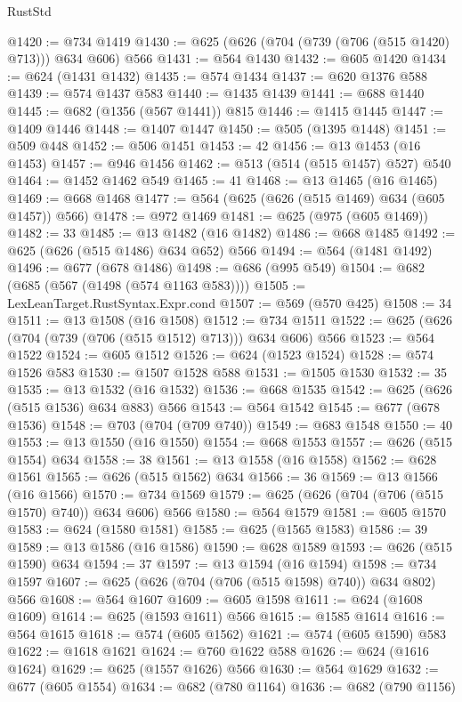 \begin{lexlean}{RustStd}
\begin{coremodule}
@1420 := @734 @1419
@1430 := @625 (@626 (@704 (@739 (@706 (@515 @1420) @713))) @634 @606) @566
@1431 := @564 @1430
@1432 := @605 @1420
@1434 := @624 (@1431 @1432)
@1435 := @574 @1434
@1437 := @620 @1376 @588
@1439 := @574 @1437 @583
@1440 := @1435 @1439
@1441 := @688 @1440
@1445 := @682 (@1356 (@567 @1441)) @815
@1446 := @1415 @1445
@1447 := @1409 @1446
@1448 := @1407 @1447
@1450 := @505 (@1395 @1448)
@1451 := @509 @448
@1452 := @506 @1451
@1453 := 42
@1456 := @13 @1453 (@16 @1453)
@1457 := @946 @1456
@1462 := @513 (@514 (@515 @1457) @527) @540
@1464 := @1452 @1462 @549
@1465 := 41
@1468 := @13 @1465 (@16 @1465)
@1469 := @668 @1468
@1477 := @564 (@625 (@626 (@515 @1469) @634 (@605 @1457)) @566)
@1478 := @972 @1469
@1481 := @625 (@975 (@605 @1469))
@1482 := 33
@1485 := @13 @1482 (@16 @1482)
@1486 := @668 @1485
@1492 := @625 (@626 (@515 @1486) @634 @652) @566
@1494 := @564 (@1481 @1492)
@1496 := @677 (@678 @1486)
@1498 := @686 (@995 @549)
@1504 := @682 (@685 (@567 (@1498 (@574 @1163 @583))))
@1505 := LexLeanTarget.RustSyntax.Expr.cond
@1507 := @569 (@570 @425)
@1508 := 34
@1511 := @13 @1508 (@16 @1508)
@1512 := @734 @1511
@1522 := @625 (@626 (@704 (@739 (@706 (@515 @1512) @713))) @634 @606) @566
@1523 := @564 @1522
@1524 := @605 @1512
@1526 := @624 (@1523 @1524)
@1528 := @574 @1526 @583
@1530 := @1507 @1528 @588
@1531 := @1505 @1530
@1532 := 35
@1535 := @13 @1532 (@16 @1532)
@1536 := @668 @1535
@1542 := @625 (@626 (@515 @1536) @634 @883) @566
@1543 := @564 @1542
@1545 := @677 (@678 @1536)
@1548 := @703 (@704 (@709 @740))
@1549 := @683 @1548
@1550 := 40
@1553 := @13 @1550 (@16 @1550)
@1554 := @668 @1553
@1557 := @626 (@515 @1554) @634
@1558 := 38
@1561 := @13 @1558 (@16 @1558)
@1562 := @628 @1561
@1565 := @626 (@515 @1562) @634
@1566 := 36
@1569 := @13 @1566 (@16 @1566)
@1570 := @734 @1569
@1579 := @625 (@626 (@704 (@706 (@515 @1570) @740)) @634 @606) @566
@1580 := @564 @1579
@1581 := @605 @1570
@1583 := @624 (@1580 @1581)
@1585 := @625 (@1565 @1583)
@1586 := 39
@1589 := @13 @1586 (@16 @1586)
@1590 := @628 @1589
@1593 := @626 (@515 @1590) @634
@1594 := 37
@1597 := @13 @1594 (@16 @1594)
@1598 := @734 @1597
@1607 := @625 (@626 (@704 (@706 (@515 @1598) @740)) @634 @802) @566
@1608 := @564 @1607
@1609 := @605 @1598
@1611 := @624 (@1608 @1609)
@1614 := @625 (@1593 @1611) @566
@1615 := @1585 @1614
@1616 := @564 @1615
@1618 := @574 (@605 @1562)
@1621 := @574 (@605 @1590) @583
@1622 := @1618 @1621
@1624 := @760 @1622 @588
@1626 := @624 (@1616 @1624)
@1629 := @625 (@1557 @1626) @566
@1630 := @564 @1629
@1632 := @677 (@605 @1554)
@1634 := @682 (@780 @1164)
@1636 := @682 (@790 @1156)

\end{coremodule}
\end{lexlean}
